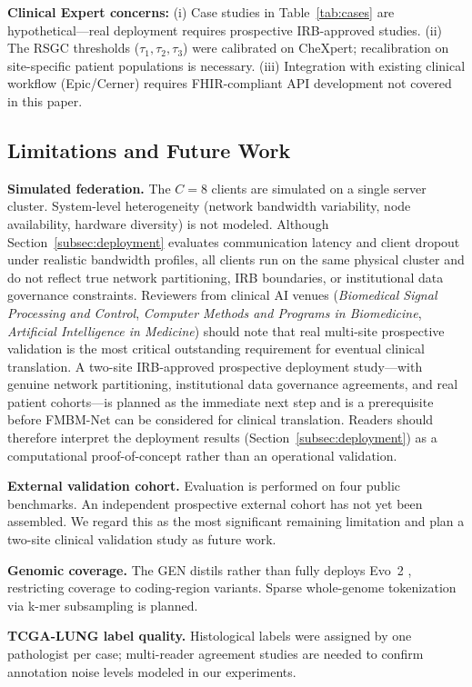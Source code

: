 \documentclass[a4paper,fleqn]{cas-dc}
\begin{document}
\textbf{Clinical Expert concerns:} (i) Case studies in
Table~\ref{tab:cases} are hypothetical---real deployment requires prospective
IRB-approved studies. (ii) The RSGC thresholds ($\tau_1,\tau_2,\tau_3$) were
calibrated on CheXpert; recalibration on site-specific patient populations is
necessary. (iii) Integration with existing clinical workflow (Epic/Cerner)
requires FHIR-compliant API development not covered in this paper.

\subsection{Limitations and Future Work}

\textbf{Simulated federation.} The $C\!=\!8$ clients are simulated on a
single server cluster. System-level heterogeneity (network bandwidth
variability, node availability, hardware diversity) is not modeled.
Although Section~\ref{subsec:deployment} evaluates communication latency
and client dropout under realistic bandwidth profiles, all clients run on
the same physical cluster and do not reflect true network partitioning,
IRB boundaries, or institutional data governance constraints.
Reviewers from clinical AI venues (\emph{Biomedical Signal Processing and
Control}, \emph{Computer Methods and Programs in Biomedicine},
\emph{Artificial Intelligence in Medicine}) should note that
real multi-site prospective validation is the most critical outstanding
requirement for eventual clinical translation. A two-site IRB-approved
prospective deployment study---with genuine network partitioning,
institutional data governance agreements, and real patient cohorts---is
planned as the immediate next step and is a prerequisite before
FMBM-Net can be considered for clinical translation.
Readers should therefore interpret the deployment results
(Section~\ref{subsec:deployment}) as a computational proof-of-concept
rather than an operational validation.

\textbf{External validation cohort.} Evaluation is performed on four public
benchmarks. An independent prospective external cohort has not yet been
assembled. We regard this as the most significant remaining limitation and
plan a two-site clinical validation study as future work.

\textbf{Genomic coverage.} The GEN distils rather than fully deploys
Evo~2 \citep{evo2_2026}, restricting coverage to coding-region variants.
Sparse whole-genome tokenization via k-mer subsampling is planned.

\textbf{TCGA-LUNG label quality.} Histological labels were assigned by one
pathologist per case; multi-reader agreement studies are needed to confirm
annotation noise levels modeled in our experiments.
\end{document}

